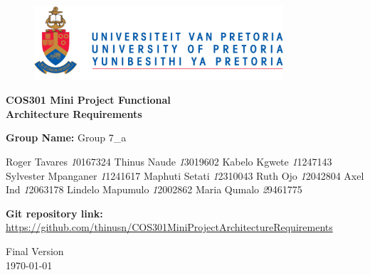 \begin{titlepage}
	\begin{center}
		
		\begin{figure}[t]
			\centering
			\includegraphics[width=350px]{UP_Logo.png}
		\end{figure}		
		
		\textbf{\LARGE COS301 Mini Project Functional \\Architecture Requirements\\}
		
		\vspace{1 cm}
		
		\LARGE{\textbf{Group Name: }Group 7\_a}
		

		\begin{flushright} \large
			Roger Tavares \emph10167324\newline
			Thinus Naude \emph13019602 \newline
			Kabelo Kgwete \emph11247143\newline
			Sylvester Mpanganer \emph11241617\newline
			Maphuti Setati \emph12310043\newline
			Ruth Ojo \emph12042804\newline
			Axel Ind \emph12063178\newline
			Lindelo Mapumulo \emph12002862\newline
			Maria Qumalo \emph29461775\newline
		\end{flushright}
		
		\vfill
		
		\textbf{Git repository link:\\}
		\url{https://github.com/thinusn/COS301MiniProjectArchitectureRequirements}
		
		\vfill
		
		{\LARGE Final Version}
		\\
		{\large \today}		
		
		
	\end{center}
\end{titlepage}
